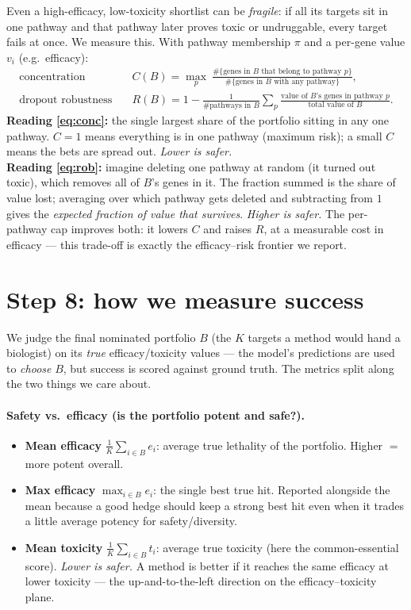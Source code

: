 \documentclass[11pt]{article}
\begin{document}
Even a high-efficacy, low-toxicity shortlist can be \emph{fragile}: if all its targets sit
in one pathway and that pathway later proves toxic or undruggable, every target fails at
once. We measure this. With pathway membership $\pi$ and a per-gene value $v_i$ (e.g.\
efficacy):
\begin{align}
\text{concentration}\quad & C(B)=\max_{p}\ \frac{\#\{\text{genes in } B \text{ that belong to pathway } p\}}{\#\{\text{genes in } B \text{ with any pathway}\}}, \label{eq:conc}\\[2pt]
\text{dropout robustness}\quad & R(B)=1-\frac{1}{\#\text{pathways in }B}\sum_{p}\frac{\text{value of }B\text{'s genes in pathway }p}{\text{total value of }B}. \label{eq:rob}
\end{align}
\textbf{Reading \eqref{eq:conc}:} the single largest share of the portfolio sitting in any
one pathway. $C=1$ means everything is in one pathway (maximum risk); a small $C$ means the
bets are spread out. \emph{Lower is safer.}\\
\textbf{Reading \eqref{eq:rob}:} imagine deleting one pathway at random (it turned out
toxic), which removes all of $B$'s genes in it. The fraction summed is the share of value
lost; averaging over which pathway gets deleted and subtracting from $1$ gives the
\emph{expected fraction of value that survives}. \emph{Higher is safer.} The per-pathway
cap improves both: it lowers $C$ and raises $R$, at a measurable cost in efficacy --- this
trade-off is exactly the efficacy--risk frontier we report.

\section{Step 8: how we measure success}
We judge the final nominated portfolio $B$ (the $K$ targets a method would hand a
biologist) on its \emph{true} efficacy/toxicity values --- the model's predictions are used
to \emph{choose} $B$, but success is scored against ground truth. The metrics split along
the two things we care about.

\paragraph{Safety vs.\ efficacy (is the portfolio potent and safe?).}
\begin{itemize}[leftmargin=2em,itemsep=1pt]
\item \textbf{Mean efficacy} $\tfrac1K\sum_{i\in B} e_i$: average true lethality of the
portfolio. Higher $=$ more potent overall.
\item \textbf{Max efficacy} $\max_{i\in B} e_i$: the single best true hit. Reported
alongside the mean because a good hedge should keep a strong best hit even when it trades a
little average potency for safety/diversity.
\item \textbf{Mean toxicity} $\tfrac1K\sum_{i\in B} t_i$: average true toxicity (here the
common-essential score). \emph{Lower is safer.} A method is better if it reaches the same
efficacy at lower toxicity --- the up-and-to-the-left direction on the efficacy--toxicity
plane.
\end{itemize}
\end{document}
